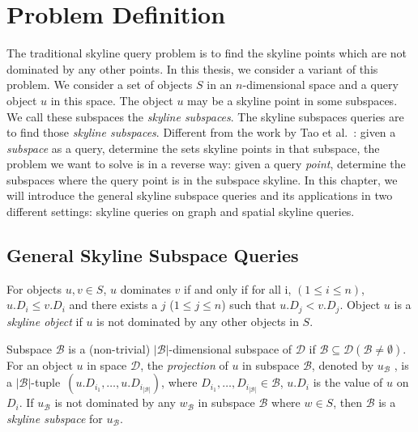 
%
%

\chapter{Problem Definition}
\label{ch:prob-def}

The traditional skyline query problem is to find the skyline points which are not dominated by any other points. In this thesis, we consider a variant of this problem. We consider a set of objects $S$ in an $n$-dimensional space and a query object $u$ in this space. The object $u$ may be a skyline point in some subspaces. We call these subspaces the \emph{skyline subspaces}. The skyline subspaces queries are to find those \emph{skyline subspaces}. Different from the work by Tao et al.~\cite{tao2006subsky}: given a \emph{subspace} as a query, determine the sets skyline points in that subspace, the problem we want to solve is in a reverse way: given a query \emph{point}, determine the subspaces where the query point is in the subspace skyline. In this chapter, we will introduce the general skyline subspace queries and its applications in two different settings: skyline queries on graph and spatial skyline queries.

\section{General Skyline Subspace Queries}

\begin{definition}[Skyline]
For objects $u, v \in S$, $u$ dominates $v$ if and only if for all i, $(1 \leq i \leq n)$, $u.D_i \leq v.D_i$ and there exists a $j$ ($1 \leq j \leq n$) such that $u.D_j < v.D_j$. Object $u$ is a \emph{skyline object} if $u$ is not dominated by any other objects in $S$.
\end{definition}

\begin{definition}
Subspace $\mathcal{B}$ is a (non-trivial) $|\mathcal{B}|$-dimensional subspace of $\mathcal{D}$ 
if $\mathcal{B}\subseteq \mathcal{D} (\mathcal{B}\neq\emptyset)$.
For an object $u$ in space $\mathcal{D}$, 
the \emph{projection} of $u$ in subspace $\mathcal{B}$, denoted by $u_\mathcal{B}$
, is a $|\mathcal{B}|$-tuple~$(u.D_{i_1},\dots,u.D_{i_{|\mathcal{B}|}})$,
where $D_{i_1},\dots,D_{i_{|\mathcal{B}|}} \in \mathcal{B}$, $u.D_i$ is the value of $u$ on $D_i$. If $u_\mathcal{B}$ is not dominated by any $w_\mathcal{B}$ in subspace $\mathcal{B}$ where $w \in S$, then $\mathcal{B}$ is a \emph{skyline subspace} for $u_\mathcal{B}$.
\end{definition}

